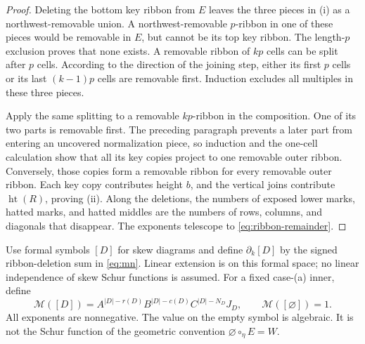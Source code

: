 \documentclass[11pt,a4paper]{amsart}
\numberwithin{equation}{section}
\theoremstyle{plain}
\theoremstyle{definition}
\begin{document}
\begin{proof}
Deleting the bottom key ribbon from \(E\) leaves the three pieces in (i) as a northwest-removable union.  A northwest-removable \(p\)-ribbon in one of these pieces would be removable in \(E\), but cannot be its top key ribbon.  The length-\(p\) exclusion proves that none exists.  A removable ribbon of \(kp\) cells can be split after \(p\) cells.  According to the direction of the joining step, either its first \(p\) cells or its last \((k-1)p\) cells are removable first.  Induction excludes all multiples in these three pieces.

Apply the same splitting to a removable \(kp\)-ribbon in the composition.  One of its two parts is removable first.  The preceding paragraph prevents a later part from entering an uncovered normalization piece, so induction and the one-cell calculation show that all its key copies project to one removable outer ribbon.  Conversely, those copies form a removable ribbon for every removable outer ribbon.  Each key copy contributes height \(b\), and the vertical joins contribute \(\operatorname{ht}(R)\), proving (ii).  Along the deletions, the numbers of exposed lower marks, hatted marks, and hatted middles are the numbers of rows, columns, and diagonals that disappear.  The exponents telescope to \eqref{eq:ribbon-remainder}.
\end{proof}

Use formal symbols \([D]\) for skew diagrams and define \(\partial_k[D]\) by the signed ribbon-deletion sum in \eqref{eq:mn}.  Linear extension is on this formal space; no linear independence of skew Schur functions is assumed.  For a fixed case-(a) inner, define
\begin{equation}\label{eq:modified}
 \mathcal M([D])=A^{|D|-r(D)}B^{|D|-c(D)}C^{|D|-N_D}J_D,
 \qquad \mathcal M([\varnothing])=1.
\end{equation}
All exponents are nonnegative.  The value on the empty symbol is algebraic.  It is not the Schur function of the geometric convention \(\varnothing\circ_\eta E=W\).
\end{document}
